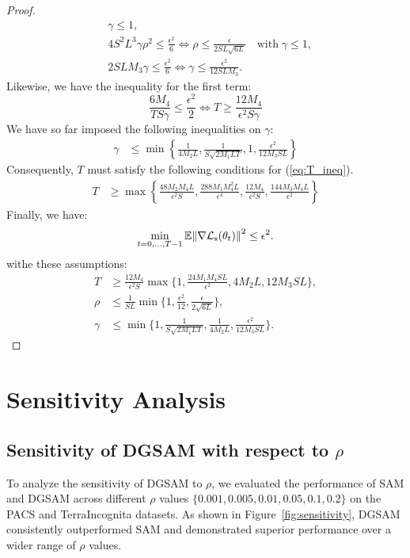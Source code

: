 \documentclass{article}
\theoremstyle{plain}
\theoremstyle{definition}
\theoremstyle{remark}
\newcommand{\no}[1]{{\left\lVert #1 \right\rVert}}
\begin{document}
\begin{proof}
\begin{align*}
        &\gamma\leq1,\\
        &4S^2L^3\gamma\rho^2\leq\frac{\epsilon^2}{6} \iff\rho \leq \frac{\epsilon}{2SL\sqrt{6L}} \quad \text{with} \;\gamma\leq1,\\
        &2SLM_3\gamma \leq \frac{\epsilon^2}{6} \iff\gamma \leq \frac{\epsilon^2}{12SLM_3}.
        \end{align*}
    Likewise, we have the inequality for the first term:
    \begin{equation}
        \frac{6M_4}{TS\gamma} \leq \frac{\epsilon^2}{2} \iff T \geq \frac{12M_4}{\epsilon^2 S\gamma} \label{eq:T_ineq}
    \end{equation}
    We have so far imposed the following inequalities on \(\gamma\):
    \begin{align*}
        \gamma&\leq \min\left\{\frac{1}{4M_2L},\frac{1}{S\sqrt{2M_1LT}}, 1,\frac{\epsilon^2}{12M_3SL}\right\}
    \end{align*}
    Consequently, \(T\) must satisfy the following conditions for (\ref{eq:T_ineq}).
    \begin{align*}
        T&\geq\max\left\{\frac{48M_2M_4L}{\epsilon^2S},\frac{288M_1M_4^2L}{\epsilon^4}, \frac{12M_4}{\epsilon^2S}, \frac{144M_3M_4L}{\epsilon^2}\right\}        
    \end{align*}
    Finally, we have:
    \begin{align*}
        \min_{t=0,\dots,T-1} \E\no{\nabla\gL_{\text{s}}(\theta_t)}^2 \leq \epsilon^2.
    \end{align*}
    withe these assumptions:
    \begin{align*}
        T&\geq \frac{12M_4}{\epsilon^2S}\max\{1,\frac{24M_1M_4SL}{\epsilon^2},4M_2L,12M_3SL\},\\
        \rho&\leq\frac{1}{SL}\min\{1,\frac{\epsilon^2}{12},\frac{\epsilon}{2\sqrt{6L}}\},\\
        \gamma&\leq\min\{1,\frac{1}{S\sqrt{2M_1LT}},\frac{1}{4M_2L},\frac{\epsilon^2}{12M_3SL}\}.
    \end{align*}
    
\end{proof}



\section{Sensitivity Analysis}\label{app:sensitive analysis}

\subsection{Sensitivity of DGSAM with respect to $\rho$}
To analyze the sensitivity of DGSAM to $\rho$, we evaluated the performance of SAM and DGSAM across different $\rho$ values $\{0.001, 0.005, 0.01, 0.05, 0.1, 0.2\}$ on the PACS and TerraIncognita datasets. As shown in Figure~\ref{fig:sensitivity}, DGSAM consistently outperformed SAM and demonstrated superior performance over a wider range of $\rho$ values.
\end{document}
